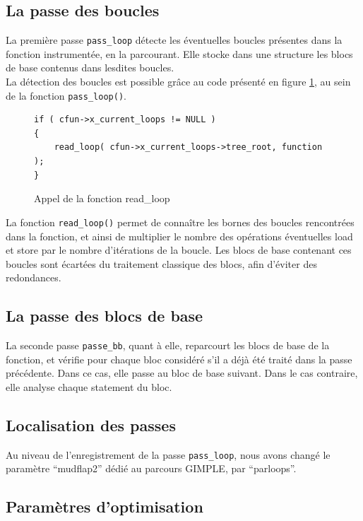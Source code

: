 \subsection{La passe des boucles}

La première passe \verb#pass_loop# détecte les éventuelles boucles présentes dans la fonction instrumentée, en la parcourant. Elle stocke dans une structure les blocs de base contenus dans lesdites boucles.\\

La détection des boucles est possible grâce au code présenté en figure \ref{fig:pass_loop}, au sein de la fonction \verb#pass_loop()#.\\

\begin{figure}[here]
  \centering
\begin{verbatim}
if ( cfun->x_current_loops != NULL )
{
    read_loop( cfun->x_current_loops->tree_root, function );
}
\end{verbatim}
  \caption{Appel de la fonction read\_loop}
  \label{fig:pass_loop}
\end{figure}

La fonction \verb#read_loop()# permet de connaître les bornes des boucles rencontrées dans la fonction, et ainsi de multiplier le nombre des opérations éventuelles load et store par le nombre d'itérations de la boucle. Les blocs de base contenant ces boucles sont écartées du traitement classique des blocs, afin d'éviter des redondances.

\subsection{La passe des blocs de base}

La seconde passe \verb#passe_bb#, quant à elle, reparcourt les blocs de base de la fonction, et vérifie pour chaque bloc considéré s'il a déjà été traité dans la passe précédente. Dans ce cas, elle passe au bloc de base suivant. Dans le cas contraire, elle analyse chaque statement du bloc.

\subsection{Localisation des passes}

Au niveau de l'enregistrement de la passe \verb#pass_loop#, nous avons changé le paramètre ``mudflap2'' dédié au parcours GIMPLE, par ``parloops''.

\subsection{Paramètres d'optimisation}

